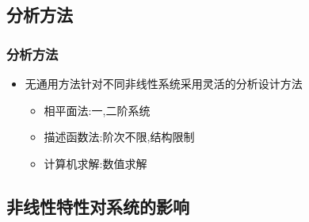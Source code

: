 \documentclass[table]{beamer}
\begin{document}
\subsection{分析方法}
\label{sec-1-2}
\begin{frame}
\frametitle{分析方法}
\label{sec-1-2-1}

\begin{itemize}
\item <2->无通用方法针对不同非线性系统采用灵活的分析设计方法
\begin{itemize}
\item <3->相平面法:一,二阶系统
\item <4->描述函数法:阶次不限,结构限制
\item <5->计算机求解:数值求解
\end{itemize}
\end{itemize}
\end{frame}
\subsection{非线性特性对系统的影响}
\label{sec-1-3}
\end{document}
